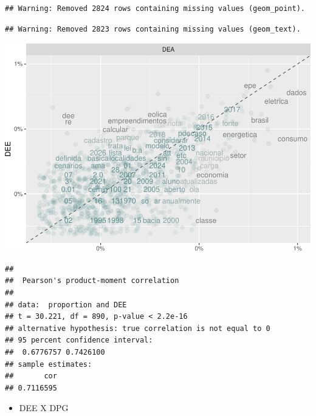 \documentclass[]{article}
\newenvironment{Shaded}{\begin{snugshade}}{\end{snugshade}}
\newcommand{\KeywordTok}[1]{\textcolor[rgb]{0.13,0.29,0.53}{\textbf{#1}}}
\newcommand{\DataTypeTok}[1]{\textcolor[rgb]{0.13,0.29,0.53}{#1}}
\newcommand{\StringTok}[1]{\textcolor[rgb]{0.31,0.60,0.02}{#1}}
\newcommand{\OperatorTok}[1]{\textcolor[rgb]{0.81,0.36,0.00}{\textbf{#1}}}
\newcommand{\NormalTok}[1]{#1}
\providecommand{\tightlist}{%
  \setlength{\itemsep}{0pt}\setlength{\parskip}{0pt}}
\begin{document}
\begin{verbatim}
## Warning: Removed 2824 rows containing missing values (geom_point).
\end{verbatim}

\begin{verbatim}
## Warning: Removed 2823 rows containing missing values (geom_text).
\end{verbatim}

\includegraphics{markdown_v30_files/figure-latex/unnamed-chunk-53-1.pdf}

\begin{Shaded}
\end{Shaded}

\begin{verbatim}
## 
##  Pearson's product-moment correlation
## 
## data:  proportion and DEE
## t = 30.221, df = 890, p-value < 2.2e-16
## alternative hypothesis: true correlation is not equal to 0
## 95 percent confidence interval:
##  0.6776757 0.7426100
## sample estimates:
##       cor 
## 0.7116595
\end{verbatim}

\begin{itemize}
\tightlist
\item
  DEE X DPG
\end{itemize}
\end{document}
